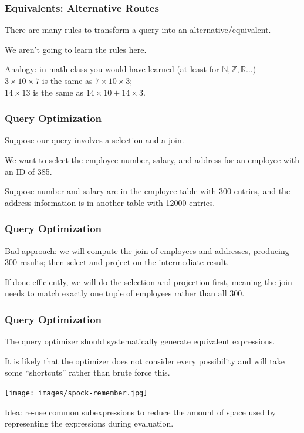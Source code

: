 \begin{frame}
\frametitle{Equivalents: Alternative Routes}

There are many rules to transform a query into an alternative/equivalent.

We aren't going to learn the rules here.

Analogy: in math class you would have learned (at least for $\mathbb{N}, \mathbb{Z}, \mathbb{R}\ldots$)\\
\quad $3 \times 10 \times 7$ is the same as $7 \times 10 \times 3$;\\
\quad $14 \times 13$ is the same as $14 \times 10 + 14 \times 3$.


\end{frame}



\begin{frame}
\frametitle{Query Optimization}

Suppose our query involves a selection and a join. 

We want to select the employee number, salary, and address for an employee with an ID of 385. 

Suppose number and salary are in the employee table with 300 entries, and the address information is in another table with 12000 entries. 

\end{frame}

\begin{frame}
\frametitle{Query Optimization}


Bad approach: we will compute the join of employees and addresses, producing 300 results; then select and project on the intermediate result.

If done efficiently, we will do the selection and projection first, meaning the join needs to match exactly one tuple of employees rather than all 300. 

\end{frame}

\begin{frame}
\frametitle{Query Optimization}
The query optimizer should systematically generate equivalent expressions. 

It is likely that the optimizer does not consider every possibility and will take some ``shortcuts'' rather than brute force this. 


\begin{center}
	\texttt{[image: images/spock-remember.jpg]}
\end{center}

Idea: re-use common subexpressions to reduce the amount of space used by representing the expressions during evaluation.

\end{frame}

